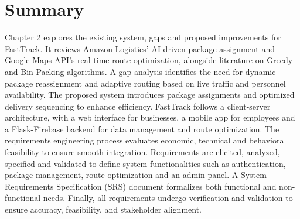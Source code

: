 \section{Summary}
Chapter 2 explores the existing system, gaps and proposed improvements for FastTrack. It
reviews Amazon Logistics’ AI-driven package assignment and Google Maps API’s real-time
route optimization, alongside literature on Greedy and Bin Packing algorithms. A gap
analysis identifies the need for dynamic package reassignment and adaptive routing based on
live traffic and personnel availability. The proposed system introduces package assignments
and optimized delivery sequencing to enhance efficiency.
FastTrack follows a client-server architecture, with a web interface for businesses, a mobile
app for employees and a Flask-Firebase backend for data management and route optimization.
The requirements engineering process evaluates economic, technical and behavioral feasibility
to ensure smooth integration. Requirements are elicited, analyzed, specified and validated to
define system functionalities such as authentication, package management, route optimization
and an admin panel. A System Requirements Specification (SRS) document formalizes
both functional and non-functional needs. Finally, all requirements undergo verification and
validation to ensure accuracy, feasibility, and stakeholder alignment.